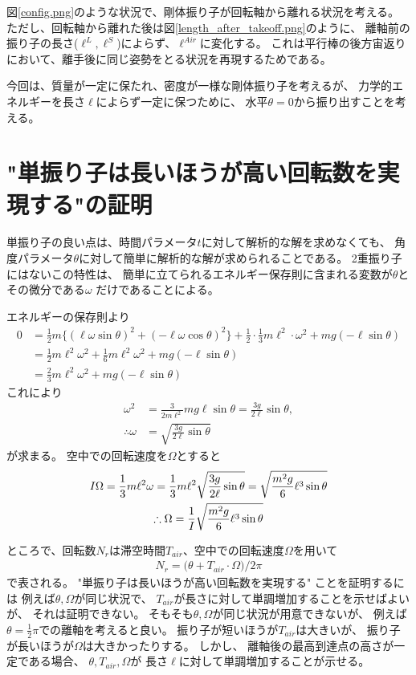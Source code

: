 \documentclass[a4paper,11pt]{jsarticle}
\begin{document}
図\ref{config.png}のような状況で、剛体振り子が回転軸から離れる状況を考える。
ただし、回転軸から離れた後は図\ref{length_after_takeoff.png}のように、
離軸前の振り子の長さ($\ell^L, \ell^S$)によらず、$\ell^{Air}$に変化する。
これは平行棒の後方宙返りにおいて、離手後に同じ姿勢をとる状況を再現するためである。

今回は、質量が一定に保たれ、密度が一様な剛体振り子を考えるが、
力学的エネルギーを長さ$\ell$によらず一定に保つために、
水平$\theta = 0$から振り出すことを考える。

\section{"単振り子は長いほうが高い回転数を実現する"の証明}

単振り子の良い点は、時間パラメータ$t$に対して解析的な解を求めなくても、
角度パラメータ$\theta$に対して簡単に解析的な解が求められることである。
2重振り子にはないこの特性は、
簡単に立てられるエネルギー保存則に含まれる変数が$\theta$とその微分である$\omega$
だけであることによる。

エネルギーの保存則より
\begin{align*}
  0 
  &= \frac{1}{2} m \Big\{ (\ell\omega\sin\theta)^2 + (-\ell\omega\cos\theta)^2  \Big\}
  + \frac{1}{2} \cdot \frac{1}{3} m\ell^2 \cdot \omega^2
  + mg (-\ell \sin\theta )
  \\
  &= \frac{1}{2}m\ell^2\omega^2 + \frac{1}{6}m\ell^2\omega^2 + mg (-\ell\sin\theta)
  \\
  &= \frac{2}{3}m\ell^2\omega^2 + mg (-\ell\sin\theta)
\end{align*}
これにより
\begin{align*}
  \omega^2 &= \frac{3}{2m\ell^2}mg\ell\sin\theta = \frac{3g}{2\ell}\sin\theta,
  \\
  \therefore
  \omega &= \sqrt{ \frac{3g}{2\ell}\sin\theta }
\end{align*}
が求まる。
空中での回転速度を$\Omega$とすると
\begin{gather}
  I\Omega 
  = \frac{1}{3}m\ell^2\omega
  = \frac{1}{3}m\ell^2 \sqrt{ \frac{3g}{2\ell}\sin\theta }
  = \sqrt{ \frac{m^2 g}{6} \ell^3 \sin\theta }
  \notag
  \\
  \therefore \Omega
  = \frac{1}{I} \sqrt{ \frac{m^2 g}{6} \ell^3 \sin\theta }
  \label{eq:Omega}
\end{gather}

ところで、回転数$N_r$は滞空時間$T_{air}$、空中での回転速度$\Omega$を用いて
\begin{align*}
  N_r = \Big( \theta + T_{air} \cdot \Omega \Big) / 2\pi
\end{align*}
で表される。
"単振り子は長いほうが高い回転数を実現する"
ことを証明するには
例えば$\theta, \Omega$が同じ状況で、
$T_{air}$が長さに対して単調増加することを示せばよいが、
それは証明できない。
そもそも$\theta, \Omega$が同じ状況が用意できないが、
例えば$\theta=\frac{1}{2}\pi$での離軸を考えると良い。
振り子が短いほうが$T_{air}$は大きいが、
振り子が長いほうが$\Omega$は大きかったりする。
しかし、
離軸後の最高到達点の高さが一定である場合、
$\theta, T_{air}, \Omega$が
長さ$\ell$に対して単調増加することが示せる。
\end{document}
